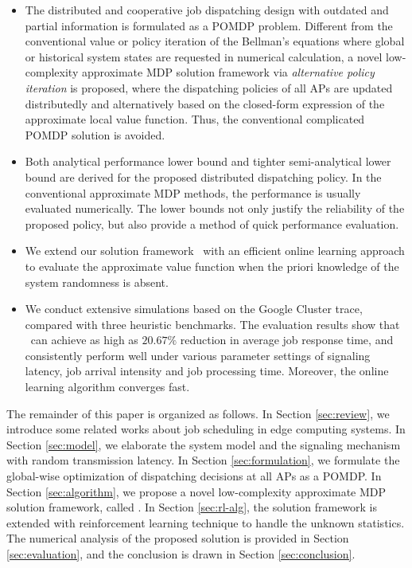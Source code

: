 \begin{itemize}
    \item The distributed and cooperative job dispatching design with outdated and partial information is formulated as a POMDP problem.
    Different from the conventional value or policy iteration of the Bellman's equations where global or historical system states are requested in numerical calculation, a novel low-complexity approximate MDP solution framework via \emph{alternative policy iteration} is proposed, where the dispatching policies of all APs are updated distributedly and alternatively based on the {closed-form expression} of the approximate local value function.
    Thus, the conventional complicated POMDP solution is avoided.
    \item Both analytical performance lower bound and tighter semi-analytical lower bound are derived for the proposed distributed dispatching policy. In the conventional approximate MDP methods, the performance is usually evaluated numerically.
    The lower bounds not only justify the reliability of the proposed policy, but also provide a method of quick performance evaluation.
    \item We extend our solution framework \algname~with an efficient online learning approach to evaluate the approximate value function when the priori knowledge of the system randomness is absent.
    \item We conduct extensive simulations based on the Google Cluster trace, compared with three heuristic benchmarks. The evaluation results show that \algname~can achieve as high as $20.67\%$ reduction in average job response time, and consistently perform well under various parameter settings of signaling latency, job arrival intensity and job processing time. {Moreover, the online learning algorithm converges fast.}
\end{itemize}


The remainder of this paper is organized as follows.
In Section \ref{sec:review}, we introduce some related works about job scheduling in edge computing systems.
In Section \ref{sec:model}, we elaborate the system model and the signaling mechanism with random transmission latency.
In Section \ref{sec:formulation}, we formulate the global-wise optimization of dispatching decisions at all APs as a POMDP.
In Section \ref{sec:algorithm}, we propose a novel low-complexity approximate MDP solution framework, called \algname.
In Section \ref{sec:rl-alg}, the solution framework is extended with reinforcement learning technique to handle the unknown statistics.
The numerical analysis of the proposed solution is provided in Section \ref{sec:evaluation}, and the conclusion is drawn in Section \ref{sec:conclusion}.

